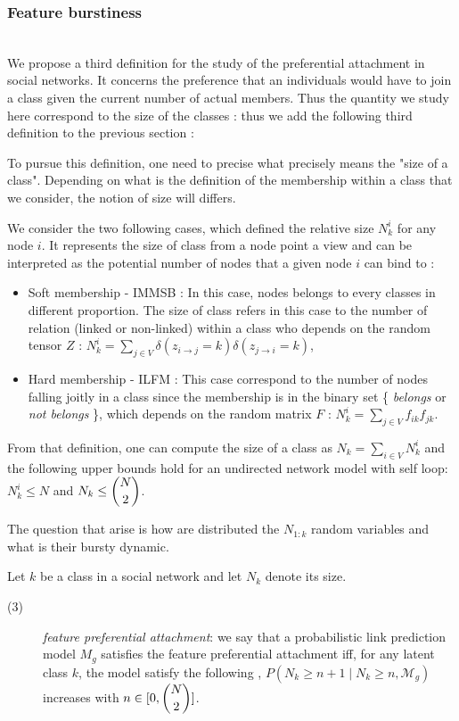 \documentclass{llncs}
\newcommand{\pr}{P}
\begin{document}
\subsubsection{Feature burstiness}~\\

We propose a third definition for the study of the preferential attachment in social networks. It concerns the preference that an individuals would have to join a class given the current number of actual members. Thus the quantity we study here correspond to the size of the classes : thus we add the following third definition to the previous section : 

To pursue this definition, one need to precise what precisely means the "size of a class". Depending on what is the definition of the membership within a class that we consider, the notion of size will differs.

We consider the two following cases, which defined the relative size $N_k^i$ for any node $i$. It represents the size of class from a node point a view and can be interpreted as the potential number of nodes that a given node $i$ can bind to :
\begin{itemize}
    \item Soft membership - IMMSB : In this case, nodes belongs to every classes in different proportion. The size of class refers in this case to the number of relation (linked or non-linked) within a class who depends on the random tensor $Z$ : $N_k^i = \sum_{j \in V} \delta(z_{i\rightarrow j}=k)\delta(z_{j\rightarrow i}=k)$,
    \item Hard membership - ILFM : This case correspond to the number of nodes falling joitly in a class since the membership is in the binary set \{ \emph{belongs} or \emph{not belongs} \}, which depends on the random matrix $F$ : $N_k^i = \sum_{j\in V} f_{ik}f_{jk}$.
\end{itemize}

From that definition, one can compute the size of a class as $N_k = \sum_{i\in V} N_k^i$ and the following upper bounds hold for an undirected network model with self loop: $N_k^i \leq N$ and $N_k \leq \dbinom{N}{2}$.

The question that arise is how are distributed the $N_{1:k}$ random variables and what is their bursty dynamic.

\begin{definition}
Let $k$ be a class in a social network and let $N_k$ denote its size. 
\begin{description}
    \item[(3)] \emph{feature preferential attachment}: we say that a probabilistic link prediction model $M_g$ satisfies the feature preferential attachment iff, for any latent class $k$, the model satisfy the following , $\pr(N_k \ge n+1 \mid N_k \ge n, \mathcal{M}_g)$ increases with $n \in [0,\dbinom{N}{2}]$.
\end{description}
\label{def:burst-soc-net2}
\end{definition}
\end{document}
